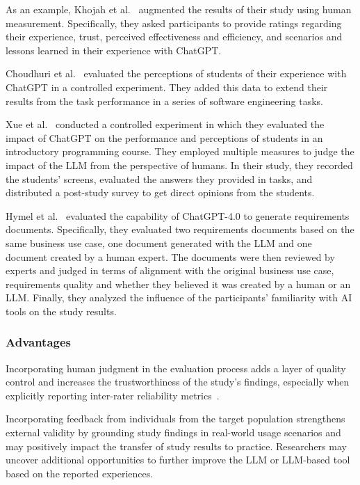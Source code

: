 As an example, Khojah et al.~\cite{DBLP:journals/pacmse/KhojahM0N24} augmented the results of their study using human measurement.
Specifically, they asked participants to provide ratings regarding their experience, trust, perceived effectiveness and efficiency, and scenarios and lessons learned in their experience with ChatGPT.

Choudhuri et al.~\cite{DBLP:conf/icse/ChoudhuriLSGS24} evaluated the perceptions of students of their experience with ChatGPT in a controlled experiment.
They added this data to extend their results from the task performance in a series of software engineering tasks.

Xue et al.~\cite{DBLP:conf/icse/XueCBTH24} conducted a controlled experiment in which they evaluated the impact of ChatGPT on the performance and perceptions of students in an introductory programming course.
They employed multiple measures to judge the impact of the LLM from the perspective of humans.
In their study, they recorded the students' screens, evaluated the answers they provided in tasks, and distributed a post-study survey to get direct opinions from the students.

Hymel et al.~\cite{hymel2025analysisllmsvshuman} evaluated the capability of ChatGPT-4.0 to generate requirements documents. 
Specifically, they evaluated two requirements documents based on the same business use case, one document generated with the LLM and one document created by a human expert.
The documents were then reviewed by experts and judged in terms of alignment with the original business use case, requirements quality and whether they believed it was created by a human or an LLM.
Finally, they analyzed the influence of the participants' familiarity with AI tools on the study results.

\subsubsection{Advantages}

Incorporating human judgment in the evaluation process adds a layer of quality control and increases the trustworthiness of the study's findings, especially when explicitly reporting inter-rater reliability metrics~\cite{khraisha2024canlargelanguagemodelshumans}.

Incorporating feedback from individuals from the target population strengthens external validity by grounding study findings in real-world usage scenarios and may positively impact the transfer of study results to practice.
Researchers may uncover additional opportunities to further improve the LLM or LLM-based tool based on the reported experiences.


